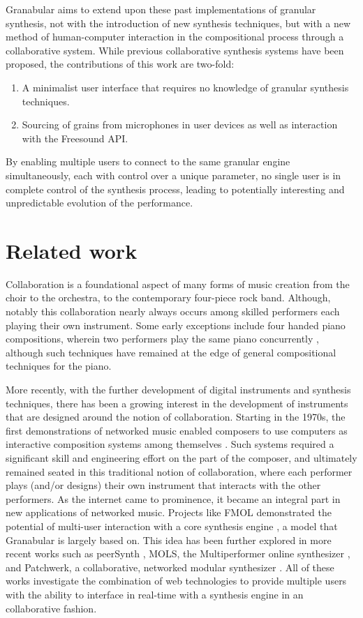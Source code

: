 \documentclass{nime-alternate}
\begin{document}
Granabular aims to extend upon these past implementations of granular synthesis, not with the introduction of new synthesis techniques, 
but with a new method of human-computer interaction in the compositional process through a collaborative system. 
While previous collaborative synthesis systems have been proposed, the contributions of this work are two-fold:

\begin{enumerate}
	\item A minimalist user interface that requires no knowledge of granular synthesis techniques.
	\item Sourcing of grains from microphones in user devices as well as interaction with the Freesound API. 
\end{enumerate}

By enabling multiple users to connect to the same granular engine simultaneously, 
each with control over a unique parameter, no single user is in complete control of the synthesis process, 
leading to potentially interesting and unpredictable evolution of the performance. 

\section{Related work}

Collaboration is a foundational aspect of many forms of music creation from the choir to the orchestra, 
to the contemporary four-piece rock band. 
Although, notably this collaboration nearly always occurs among skilled performers each playing their own instrument. 
Some early exceptions include four handed piano compositions, 
wherein two performers play the same piano concurrently \cite{kuhn2001music}, 
although such techniques have remained at the edge of general compositional techniques for the piano. 

More recently, with the further development of digital instruments and synthesis techniques, 
there has been a growing interest in the development of instruments that are designed around the notion of collaboration. 
Starting in the 1970s, the first demonstrations of networked music enabled composers to use computers as interactive composition systems among themselves \cite{bischoff1978network}. 
Such systems required a significant skill and engineering effort on the part of the composer, 
and ultimately remained seated in this traditional notion of collaboration, 
where each performer plays (and/or designs) their own instrument that interacts with the other performers. 
As the internet came to prominence, it became an integral part in new applications of networked music. 
Projects like FMOL demonstrated the potential of multi-user interaction with a core synthesis engine \cite{jorda2001fmol}, 
a model that Granabular is largely based on. 
This idea has been further explored in more recent works such as peerSynth \cite{stelkens2003peersynth}, 
MOLS, the Multiperformer online synthesizer \cite{herrera2009mols}, 
and Patchwerk, a collaborative, networked modular synthesizer \cite{mayton2012patchwerk}. 
All of these works investigate the combination of web technologies to provide multiple users
with the ability to interface in real-time with a synthesis engine in an collaborative fashion.
\end{document}
